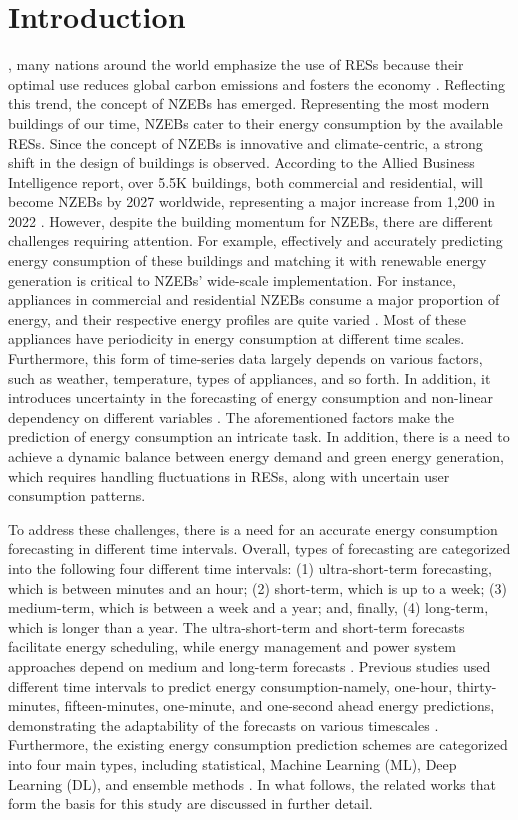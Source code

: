 \documentclass[journal]{IEEEtran}
\begin{document}
\IEEEpeerreviewmaketitle
\section{Introduction}

, many nations around the world emphasize the use of RESs \cite{Ref18} because their optimal use reduces global carbon emissions and fosters the economy \cite{Ref19}. Reflecting this trend, the concept of NZEBs has emerged. Representing the most modern buildings of our time, NZEBs cater to their energy consumption by the available RESs. Since the concept of NZEBs is innovative and climate-centric, a strong shift in the design of buildings is observed. According to the Allied Business Intelligence report, over 5.5K buildings, both commercial and residential, will become NZEBs by 2027 worldwide, representing a major increase from 1,200 in 2022 \cite{Ref31}. However, despite the building momentum for NZEBs, there are different challenges requiring attention. For example, effectively and accurately predicting energy consumption of these buildings and matching it with renewable energy generation is critical to NZEBs' wide-scale implementation. For instance, appliances in commercial and residential NZEBs consume a major proportion of energy, and their respective energy profiles are quite varied \cite{Ref18}. Most of these appliances have periodicity in energy consumption at different time scales. Furthermore, this form of time-series data largely depends on various factors, such as weather, temperature, types of appliances, and so forth. In addition, it introduces uncertainty in the forecasting of energy consumption and non-linear dependency on different variables \cite{Ref22}. The aforementioned factors make the prediction of energy consumption an intricate task. In addition, there is a need to achieve a dynamic balance between energy demand and green energy generation, which requires handling fluctuations in RESs, along with uncertain user consumption patterns. 

To address these challenges, there is a need for an accurate energy consumption forecasting in different time intervals. Overall, types of forecasting are categorized into the following four different time intervals: (1) ultra-short-term forecasting, which is between minutes and an hour; (2) short-term, which is up to a week; (3) medium-term, which is between a week and a year; and, finally, (4) long-term, which is longer than a year. The ultra-short-term and short-term forecasts facilitate energy scheduling, while energy management and power system approaches depend on medium and long-term forecasts \cite{Ref32} \cite{Ref33}. Previous studies used different time intervals to predict energy consumption-namely, one-hour, thirty-minutes, fifteen-minutes, one-minute, and one-second ahead energy predictions, demonstrating the adaptability of the forecasts on various timescales \cite{Ref10}. Furthermore, the existing energy consumption prediction schemes are categorized into four main types, including statistical, Machine Learning (ML), Deep Learning (DL), and ensemble methods \cite{Ref23}. In what follows, the related works that form the basis for this study are discussed in further detail. 
\end{document}
